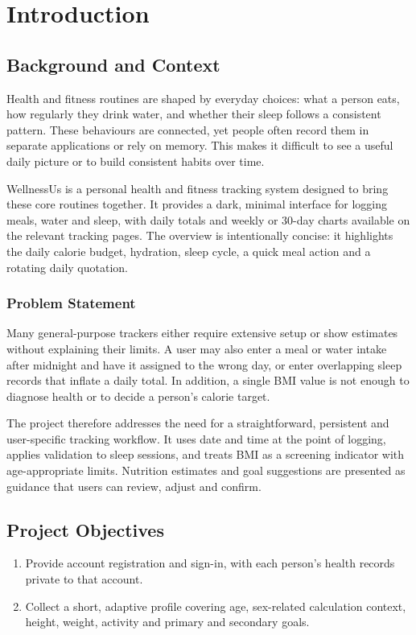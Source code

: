 \documentclass[10pt,a4paper,openany]{report}
\newcommand{\reportchapter}[1]{\chapter{#1}}
\begin{document}
\reportchapter{Introduction}
\section{Background and Context}
Health and fitness routines are shaped by everyday choices: what a person eats, how regularly they drink water, and whether their sleep follows a consistent pattern. These behaviours are connected, yet people often record them in separate applications or rely on memory. This makes it difficult to see a useful daily picture or to build consistent habits over time.

WellnessUs is a personal health and fitness tracking system designed to bring these core routines together. It provides a dark, minimal interface for logging meals, water and sleep, with daily totals and weekly or 30-day charts available on the relevant tracking pages. The overview is intentionally concise: it highlights the daily calorie budget, hydration, sleep cycle, a quick meal action and a rotating daily quotation.

\subsection{Problem Statement}
Many general-purpose trackers either require extensive setup or show estimates without explaining their limits. A user may also enter a meal or water intake after midnight and have it assigned to the wrong day, or enter overlapping sleep records that inflate a daily total. In addition, a single BMI value is not enough to diagnose health or to decide a person's calorie target.

The project therefore addresses the need for a straightforward, persistent and user-specific tracking workflow. It uses date and time at the point of logging, applies validation to sleep sessions, and treats BMI as a screening indicator with age-appropriate limits. Nutrition estimates and goal suggestions are presented as guidance that users can review, adjust and confirm.

\section{Project Objectives}
\begin{enumerate}
\item Provide account registration and sign-in, with each person's health records private to that account.
\item Collect a short, adaptive profile covering age, sex-related calculation context, height, weight, activity and primary and secondary goals.
\end{enumerate}
\clearpage
\end{document}
